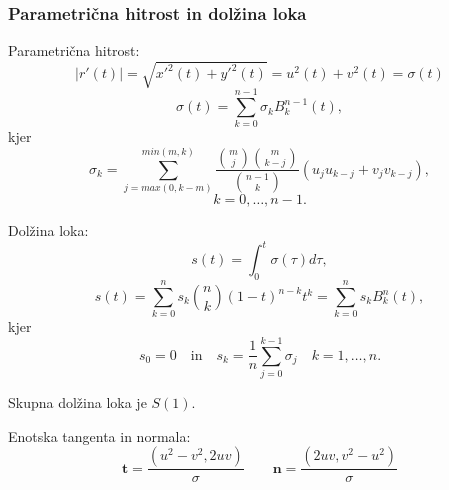 \documentclass[12pt]{beamer}
\theoremstyle{definition} %
\theoremstyle{plain} %
\begin{document}
\begin{frame}
\frametitle{Parametrična hitrost in dolžina loka}
Parametrična hitrost:
$$ | r\prime (t) | =\sqrt{x\prime^2(t)+y\prime^2(t)}= u^2 (t) + v^2 (t) = \sigma (t)$$
$$\sigma (t) =\sum_{k=0}^{n-1} \sigma_kB_k^{n-1}(t),$$
	kjer  
$$\sigma_k =\sum_{j=max(0,k-m)}^{min(m,k)}\frac{\binom{m}{j}\binom{m}{k-j}}{\binom{n-1}{k}}(u_ju_{k-j}+v_jv_{k-j}),$$ $$k = 0,\ldots , n - 1.$$
\end{frame}
\begin{frame}
    Dolžina loka:
    $$s (t) =\int^t_0\sigma(\tau) d\tau,$$
    $$s (t) =\sum^n_{k=0}s_k\binom{n}{k}(1-t)^{n-k}t^k=\sum_{k=0}^n s_kB^n_k(t),$$
	kjer  $$s_0=0 \quad \text{in} \quad s_k=\frac{1}{n}\sum^{k-1}_{j=0}\sigma_j \quad k=1,\ldots,n.$$

    Skupna dolžina loka je $S(1)$. 
    \newline
    
    Enotska tangenta in normala:
    $$\textbf{t} =\frac{(u^2 - v^2, 2uv)}{\sigma} \quad \quad
     \textbf{n} =\frac{(2uv, v^2 - u^2)}{\sigma}$$
\end{frame}
	
\end{document}
